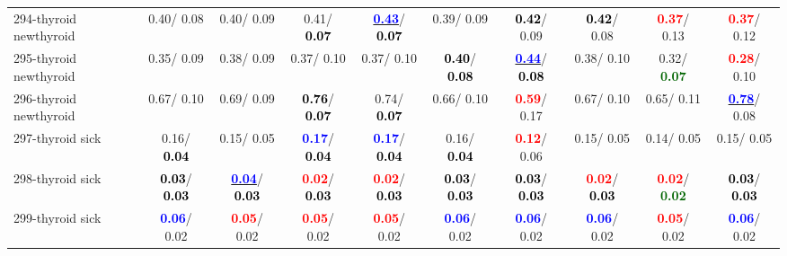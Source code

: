 \begin{table}[h]
\begin{center}
{\begin{tabular}{lc|c|c|c|c|c|c|c|c}
294-thyroid newthyroid &   0.40/  0.08 &   0.40/  0.09 &   0.41/\textcolor{black}{\textbf{  0.07}} & \underline{\textcolor{blue}{\textbf{  0.43}}}/\textcolor{black}{\textbf{  0.07}} &   0.39/  0.09 & \textcolor{black}{\textbf{  0.42}}/  0.09 & \textcolor{black}{\textbf{  0.42}}/  0.08 & \textcolor{red}{\textbf{  0.37}}/  0.13 & \textcolor{red}{\textbf{  0.37}}/  0.12 \\
295-thyroid newthyroid &   0.35/  0.09 &   0.38/  0.09 &   0.37/  0.10 &   0.37/  0.10 & \textcolor{black}{\textbf{  0.40}}/\textcolor{black}{\textbf{  0.08}} & \underline{\textcolor{blue}{\textbf{  0.44}}}/\textcolor{black}{\textbf{  0.08}} &   0.38/  0.10 &   0.32/\textcolor{darkgreen}{\textbf{  0.07}} & \textcolor{red}{\textbf{  0.28}}/  0.10 \\ \hline
296-thyroid newthyroid &   0.67/  0.10 &   0.69/  0.09 & \textcolor{black}{\textbf{  0.76}}/\textcolor{black}{\textbf{  0.07}} &   0.74/\textcolor{black}{\textbf{  0.07}} &   0.66/  0.10 & \textcolor{red}{\textbf{  0.59}}/  0.17 &   0.67/  0.10 &   0.65/  0.11 & \underline{\textcolor{blue}{\textbf{  0.78}}}/  0.08 \\
297-thyroid sick &   0.16/\textcolor{black}{\textbf{  0.04}} &   0.15/  0.05 & \textcolor{blue}{\textbf{  0.17}}/\textcolor{black}{\textbf{  0.04}} & \textcolor{blue}{\textbf{  0.17}}/\textcolor{black}{\textbf{  0.04}} &   0.16/\textcolor{black}{\textbf{  0.04}} & \textcolor{red}{\textbf{  0.12}}/  0.06 &   0.15/  0.05 &   0.14/  0.05 &   0.15/  0.05 \\
298-thyroid sick & \textcolor{black}{\textbf{  0.03}}/\textcolor{black}{\textbf{  0.03}} & \underline{\textcolor{blue}{\textbf{  0.04}}}/\textcolor{black}{\textbf{  0.03}} & \textcolor{red}{\textbf{  0.02}}/\textcolor{black}{\textbf{  0.03}} & \textcolor{red}{\textbf{  0.02}}/\textcolor{black}{\textbf{  0.03}} & \textcolor{black}{\textbf{  0.03}}/\textcolor{black}{\textbf{  0.03}} & \textcolor{black}{\textbf{  0.03}}/\textcolor{black}{\textbf{  0.03}} & \textcolor{red}{\textbf{  0.02}}/\textcolor{black}{\textbf{  0.03}} & \textcolor{red}{\textbf{  0.02}}/\textcolor{darkgreen}{\textbf{  0.02}} & \textcolor{black}{\textbf{  0.03}}/\textcolor{black}{\textbf{  0.03}} \\
299-thyroid sick & \textcolor{blue}{\textbf{  0.06}}/  0.02 & \textcolor{red}{\textbf{  0.05}}/  0.02 & \textcolor{red}{\textbf{  0.05}}/  0.02 & \textcolor{red}{\textbf{  0.05}}/  0.02 & \textcolor{blue}{\textbf{  0.06}}/  0.02 & \textcolor{blue}{\textbf{  0.06}}/  0.02 & \textcolor{blue}{\textbf{  0.06}}/  0.02 & \textcolor{red}{\textbf{  0.05}}/  0.02 & \textcolor{blue}{\textbf{  0.06}}/  0.02 \\

\end{tabular}}
\end{center}
\end{table}
